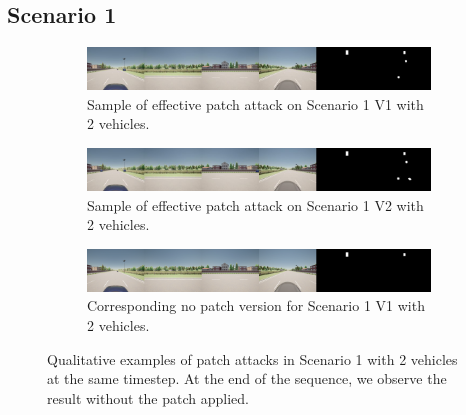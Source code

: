 \subsection{Scenario 1}
\begin{figure}[tph]
    \centering
    \begin{subfigure}[b]{1\textwidth}
        \centering
        \includegraphics[width=\textwidth]{figures/results/scenario1v12vh.jpg}
        \caption{Sample of effective patch attack on Scenario 1 V1 with 2 vehicles.}
        \label{fig:scenario1_2vh_v1}
    \end{subfigure}
    \vspace{0.5cm}
    \begin{subfigure}[b]{1\textwidth}
        \centering
        \includegraphics[width=\textwidth]{figures/results/scenario1v22vh.jpg}
        \caption{Sample of effective patch attack on Scenario 1 V2 with 2 vehicles.}
        \label{fig:scenario1_2vh_v2}
    \end{subfigure}
    \vspace{0.5cm}
    \begin{subfigure}[b]{1\textwidth}
        \centering
        \includegraphics[width=\textwidth]{figures/results/scenario1v12vh_nopatch.png}
        \caption{Corresponding no patch version for Scenario 1 V1 with 2 vehicles.}
        \label{fig:scenario1_2vh_nopatch}
    \end{subfigure}
    \caption{Qualitative examples of patch attacks in Scenario 1 with 2 vehicles at the same timestep.
        At the end of the sequence, we observe the result without the patch applied.}
    \label{fig:scenario1_2vh}
\end{figure}

